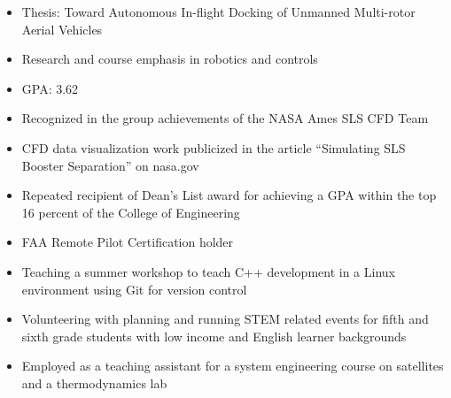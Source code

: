 
\begin{itemize}
  \item Thesis: Toward Autonomous In-flight Docking of Unmanned Multi-rotor Aerial Vehicles
  \item Research and course emphasis in robotics and controls
  \item GPA: 3.62
\end{itemize}
\divider

\smallskip
{}

\par\medskip
{}
\par\medskip
{}

\begin{itemize}
    \item Recognized in the group achievements of the NASA Ames SLS CFD Team
    \item CFD data visualization work publicized in the article “Simulating SLS Booster Separation” on nasa.gov
    \item Repeated recipient of Dean’s List award for achieving a GPA within the top 16 percent of the College of Engineering
\end{itemize}

\begin{itemize}
    \item FAA Remote Pilot Certification holder
    \item Teaching a summer workshop to teach C++ development in a Linux environment using Git for version control
    \item Volunteering with planning and running STEM related events for fifth and sixth grade students with low income and English learner backgrounds 
    \item Employed as a teaching assistant for a system engineering course on satellites and a thermodynamics lab
\end{itemize}